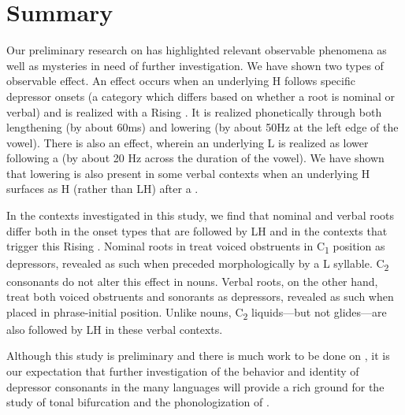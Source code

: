 \documentclass[output=paper,newtxmath,modfonts,nonflat,hidelinks]{langsci/langscibook}
\begin{document}
\section{Summary}\label{sec:lotven:5}

Our preliminary research on  has highlighted relevant observable phenomena as well as mysteries in need of further investigation. We have shown two types of observable effect. An  effect occurs when an underlying H follows specific depressor onsets (a category which differs based on whether a root is nominal or verbal) and is realized with a Rising . It is realized phonetically through both lengthening (by about 60ms) and  lowering (by about 50Hz at the left edge of the vowel). There is also an   effect, wherein an underlying L is realized as lower following a  (by about 20 Hz across the duration of the vowel). We have shown that   lowering is also present in some verbal contexts when an underlying H surfaces as H (rather than LH) after a . 

In the contexts investigated in this study, we find that nominal and verbal roots differ both in the onset types that are followed by LH and in the contexts that trigger this Rising . Nominal roots in  treat voiced obstruents in C\textsubscript{1} position as depressors, revealed as such when preceded morphologically by a L  syllable. C\textsubscript{2} consonants do not alter this effect in nouns. Verbal roots, on the other hand, treat both voiced obstruents and sonorants as depressors, revealed as such when placed in phrase-initial position. Unlike nouns, C\textsubscript{2} liquids—but not glides—are also followed by LH in these verbal contexts. 

Although this study is preliminary and there is much work to be done on , it is our expectation that further investigation of the behavior and identity of depressor consonants in the many  languages will provide a rich ground for the study of tonal bifurcation and the phonologization of .



\end{document}

